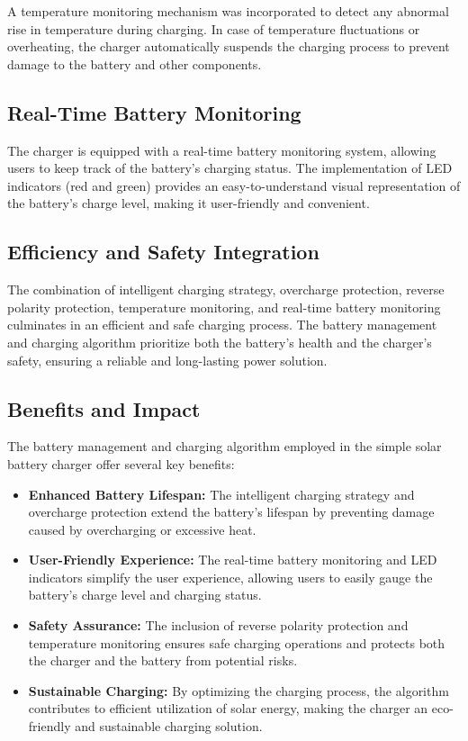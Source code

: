 \documentclass[twocolumn]{article}
\begin{document}
A temperature monitoring mechanism was incorporated to detect any abnormal rise in temperature during charging. In case of temperature fluctuations or overheating, the charger automatically suspends the charging process to prevent damage to the battery and other components.

\subsection*{Real-Time Battery Monitoring}

The charger is equipped with a real-time battery monitoring system, allowing users to keep track of the battery's charging status. The implementation of LED indicators (red and green) provides an easy-to-understand visual representation of the battery's charge level, making it user-friendly and convenient.

\subsection*{Efficiency and Safety Integration}

The combination of intelligent charging strategy, overcharge protection, reverse polarity protection, temperature monitoring, and real-time battery monitoring culminates in an efficient and safe charging process. The battery management and charging algorithm prioritize both the battery's health and the charger's safety, ensuring a reliable and long-lasting power solution.

\subsection*{Benefits and Impact}

The battery management and charging algorithm employed in the simple solar battery charger offer several key benefits:

\begin{itemize}
  \item \textbf{Enhanced Battery Lifespan:} The intelligent charging strategy and overcharge protection extend the battery's lifespan by preventing damage caused by overcharging or excessive heat.

  \item \textbf{User-Friendly Experience:} The real-time battery monitoring and LED indicators simplify the user experience, allowing users to easily gauge the battery's charge level and charging status.

  \item \textbf{Safety Assurance:} The inclusion of reverse polarity protection and temperature monitoring ensures safe charging operations and protects both the charger and the battery from potential risks.

  \item \textbf{Sustainable Charging:} By optimizing the charging process, the algorithm contributes to efficient utilization of solar energy, making the charger an eco-friendly and sustainable charging solution.

\end{itemize}
\end{document}
